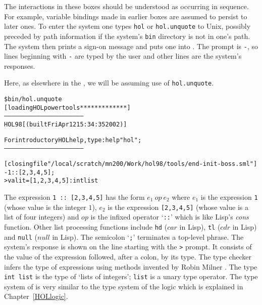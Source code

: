 The interactions in these boxes should be understood as occurring in
sequence.  For example, variable bindings made in earlier boxes are
assumed to persist to later ones.  To enter the \HOL{} system one types
{\small\verb|hol|} or {\small\verb|hol.unquote|} to Unix, possibly
  preceded by path information if the \HOL{} system's \texttt{bin}
  directory is not in one's path.  The \HOL{} system then prints a
  sign-on message and puts one into \ML.  The \ML{} prompt is
  {\small\verb|-|}, so lines beginning with {\small\verb|-|} are typed
  by the user and other lines are the system's responses.

  Here, as elsewhere in the \TUTORIAL{}, we will be assuming use of
  {\small\verb|hol.unquote|}.

\setcounter{sessioncount}{0}
\begin{session}\begin{alltt}
\$ bin/hol.unquote
[loading HOL power tools ************* ]
-----------------------------------------------------------------
       HOL98 [\holnsversion (built Fri Apr 12 15:34:35 2002)]

       For introductory HOL help, type: help "hol";
-----------------------------------------------------------------

[closing file "/local/scratch/mn200/Work/hol98/tools/end-init-boss.sml"]
- 1 :: [2,3,4,5];
> val it = [1, 2, 3, 4, 5] : int list
\end{alltt}
\end{session}

The \ML{} expression {\small\verb|1 :: [2,3,4,5]|} has the form $e_1\
op\ e_2$ where $e_1$ is the expression {\small\verb|1|} (whose value
is the integer $1$), $e_2$ is the expression {\small\verb|[2,3,4,5]|}
(whose value is a list of four integers) and $op$ is the infixed
operator `{\small\verb|::|}' which is like Lisp's {\it cons} function.
Other list processing functions include {\small\verb|hd|} ($car$ in
Lisp), {\small\verb|tl|} ($cdr$ in Lisp) and {\small\verb|null|}
($null$ in Lisp).  The semicolon `{\small\verb|;|}' terminates a
top-level phrase.  The system's response is shown on the line starting
with the {\small\verb|>|} prompt.  It consists of the value of the
expression followed, after a colon, by its type. The \ML{} type checker
infers the type of expressions using methods invented by Robin Milner
\cite{Milner-types}. The type {\small\verb|int list|} is the type of
`lists of integers'; {\small\verb|list|} is a unary type operator.
The type system of \ML{} is very similar to the type system of the
\HOL{} logic which is explained in Chapter~\ref{HOLlogic}.


